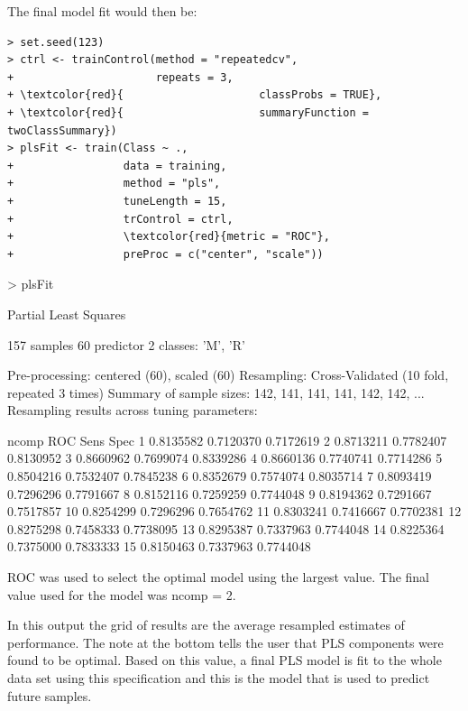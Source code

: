 \documentclass[12pt]{article}
\renewenvironment{Schunk}{\vspace{\topsep}}{\vspace{\topsep}}
\begin{document}
The final model fit would then be:
\begin{Verbatim}[fontshape=sl,formatcom=\color{darkblue},fontsize=\footnotesize,commandchars=\\\{\}]
> set.seed(123) 
> ctrl <- trainControl(method = "repeatedcv",
+                      repeats = 3,
+ \textcolor{red}{                     classProbs = TRUE},
+ \textcolor{red}{                     summaryFunction = twoClassSummary})
> plsFit <- train(Class ~ ., 
+                 data = training,
+                 method = "pls",
+                 tuneLength = 15,
+                 trControl = ctrl,
+                 \textcolor{red}{metric = "ROC"},
+                 preProc = c("center", "scale"))                     
\end{Verbatim}
\begin{Schunk}
\begin{Sinput}
> plsFit
\end{Sinput}
\begin{Soutput}
Partial Least Squares 

157 samples
 60 predictor
  2 classes: 'M', 'R' 

Pre-processing: centered (60), scaled (60) 
Resampling: Cross-Validated (10 fold, repeated 3 times) 
Summary of sample sizes: 142, 141, 141, 141, 142, 142, ... 
Resampling results across tuning parameters:

  ncomp  ROC        Sens       Spec     
   1     0.8135582  0.7120370  0.7172619
   2     0.8713211  0.7782407  0.8130952
   3     0.8660962  0.7699074  0.8339286
   4     0.8660136  0.7740741  0.7714286
   5     0.8504216  0.7532407  0.7845238
   6     0.8352679  0.7574074  0.8035714
   7     0.8093419  0.7296296  0.7791667
   8     0.8152116  0.7259259  0.7744048
   9     0.8194362  0.7291667  0.7517857
  10     0.8254299  0.7296296  0.7654762
  11     0.8303241  0.7416667  0.7702381
  12     0.8275298  0.7458333  0.7738095
  13     0.8295387  0.7337963  0.7744048
  14     0.8225364  0.7375000  0.7833333
  15     0.8150463  0.7337963  0.7744048

ROC was used to select the optimal model using  the largest value.
The final value used for the model was ncomp = 2. 
\end{Soutput}
\end{Schunk}
In this output the grid of results are the average resampled estimates of performance. The note at the bottom tells the user that  PLS components were found to be optimal. Based on this value, a final PLS model is fit to the whole data set using this specification and this is the model that is used to predict future samples.
\end{document}
